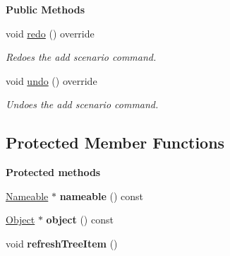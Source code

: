 \begin{Indent}\textbf{ Public Methods}\par
\begin{DoxyCompactItemize}
\item 
\mbox{\label{classrev_1_1_change_name_command_a7837b17785fdb502e23c9bafa689af38}} 
void \mbox{\hyperlink{classrev_1_1_change_name_command_a7837b17785fdb502e23c9bafa689af38}{redo}} () override
\begin{DoxyCompactList}\small\item\em Redoes the add scenario command. \end{DoxyCompactList}\item 
\mbox{\label{classrev_1_1_change_name_command_ac14b8cb4a82b2bd7de8d5f032093f258}} 
void \mbox{\hyperlink{classrev_1_1_change_name_command_ac14b8cb4a82b2bd7de8d5f032093f258}{undo}} () override
\begin{DoxyCompactList}\small\item\em Undoes the add scenario command. \end{DoxyCompactList}\end{DoxyCompactItemize}
\end{Indent}
\subsection*{Protected Member Functions}
\begin{Indent}\textbf{ Protected methods}\par
\begin{DoxyCompactItemize}
\item 
\mbox{\label{classrev_1_1_change_name_command_a0900186deada6345c76dfb02b4074520}} 
\mbox{\hyperlink{classrev_1_1_nameable}{Nameable}} $\ast$ {\bfseries nameable} () const
\item 
\mbox{\label{classrev_1_1_change_name_command_abb042ff1a692c9a1fbadc5e78cf18ae0}} 
\mbox{\hyperlink{classrev_1_1_object}{Object}} $\ast$ {\bfseries object} () const
\item 
\mbox{\label{classrev_1_1_change_name_command_aae01ee02d000c4008e561eb26806ce71}} 
void {\bfseries refresh\+Tree\+Item} ()
\end{DoxyCompactItemize}
\end{Indent}

